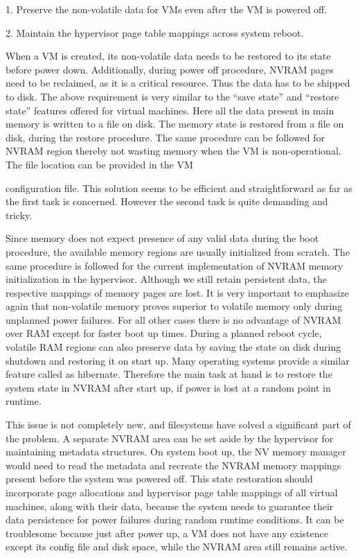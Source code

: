 1. Preserve the non-volatile data for VMs even after the VM is powered off.

2. Maintain the hypervisor page table mappings across system reboot.

When a VM is created, its non-volatile data needs to be restored to its state before power down. Additionally, during power off procedure, NVRAM pages need to be reclaimed, as it is a critical resource. Thus the data has to be shipped to disk. The above requirement is very similar to the “save state” and “restore state” features offered for virtual machines. Here all the data present in main memory is written to a file on disk. The memory state is restored from a file on disk, during the restore procedure. The same procedure can be followed for NVRAM region thereby not wasting memory when the VM is non-operational. The file location can be provided in the VM

configuration file. This solution seems to be efficient and straightforward as far as the first task is concerned. However the second task is quite demanding and tricky.

Since memory does not expect presence of any valid data during the boot procedure, the available memory regions are usually initialized from scratch. The same procedure is followed for the current implementation of NVRAM memory initialization in the hypervisor. Although we still retain persistent data, the respective mappings of memory pages are lost. It is very important to emphasize again that non-volatile memory proves superior to volatile memory only during unplanned power failures. For all other cases there is no advantage of NVRAM over RAM except for faster boot up times. During a planned reboot cycle, volatile RAM regions can also preserve data by saving the state on disk during shutdown and restoring it on start up. Many operating systems provide a similar feature called as hibernate. Therefore the main task at hand is to restore the system state in NVRAM after start up, if power is lost at a random point in runtime.

This issue is not completely new, and filesystems have solved a significant part of the problem. A separate NVRAM area can be set aside by the hypervisor for maintaining metadata structures. On system boot up, the NV memory manager would need to read the metadata and recreate the NVRAM memory mappings present before the system was powered off. This state restoration should incorporate page allocations and hypervisor page table mappings of all virtual machines, along with their data, because the system needs to guarantee their data persistence for power failures during random runtime conditions. It can be troublesome because just after power up, a VM does not have any existence except its config file and disk space, while the NVRAM area still remains active.

